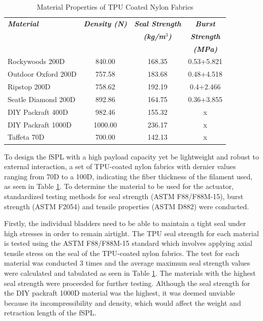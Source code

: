 \documentclass[letterpaper, 10 pt, conference]{ieeeconf}  %
\begin{document}
\begin{table}[t!]
\caption{Material Properties of TPU Coated Nylon Fabrics} 
\label{tab:materialproperty_table}
	\begin{tabularx}{0.48\textwidth}{l|c|c|c}   \toprule\toprule
    \centering
    \small
    \setlength\tabcolsep{11pt}
	\textbf{\emph{Material}} & \textbf{\emph{Density (N) }} & \textbf{\emph{Seal Strength}} & \textbf{\emph{Burst }} \\[-1pt]
                             &                              & \textbf{\emph{(kg/m$^3$)}} & \textbf{\emph{Strength}}\\
                             &                              &                            & \textbf{\emph{(MPa)}}\\\midrule
	Rockywoods 200D &840.00 &168.35 & 0.53+5.821 \\
    Outdoor Oxford 200D  &757.58 &  183.68 & 0.48+4.518\\
    Ripstop 200D &758.62 & 192.19 & 0.4+2.466\\
    Seatle Diamond 200D &892.86 & 164.75 & 0.36+3.855\\
    DIY Packraft 400D & 982.46& 155.32 & x\\
    DIY Packraft 1000D &1000.00 & 236.17 & x\\
    Taffeta 70D &700.00& 142.13 & x\\\bottomrule 
    \hline
	\end{tabularx}
\end{table}

To design the fSPL with a high payload capacity yet be lightweight and robust to external interaction, a set of TPU-coated nylon fabrics with dernier values ranging from 70D to a 100D, indicating the fiber thickness of the filament used, as seen in Table \ref{tab:materialproperty_table}. To determine the material to be used for the actuator, standardized testing methods for seal strength (ASTM F88/F88M-15), burst strength (ASTM F2054) and tensile properties (ASTM D882) were conducted.

Firstly, the individual bladders need to be able to maintain a tight seal under high stresses in order to remain airtight. The TPU seal strength for each material is tested using the ASTM F88/F88M-15 standard which involves applying axial tensile stress on the seal of the TPU-coated nylon fabrics. The test for each material was conducted 3 times and the average maximum seal strength values were calculated and tabulated as seen in Table \ref{tab:materialproperty_table}. The materials with the highest seal strength were proceeded for further testing. Although the seal strength for the DIY packraft 1000D material was the highest, it was deemed unviable because its incompressibility and density, which would affect the weight and retraction length of the fSPL.  
\end{document}
